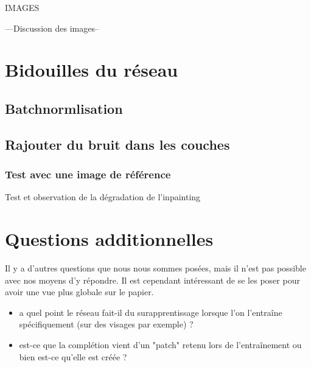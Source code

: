 \documentclass[12pt]{article}
\begin{document}
IMAGES

---Discussion des images--

\section{Bidouilles du réseau}



\subsection{Batchnormlisation}


\subsection{Rajouter du bruit dans les couches}

\subsubsection{Test avec une image de référence}
Test et observation de la dégradation de l'inpainting

\section{Questions additionnelles}

Il y a d'autres questions que nous nous sommes posées, mais il n'est pas possible avec nos moyens d'y répondre. Il est cependant intéressant de se les poser pour avoir une vue plus globale sur le papier.
\begin{itemize}
    \item a quel point le réseau fait-il du surapprentissage lorsque l'on l'entraîne spécifiquement (sur des visages par exemple) ?
    \item est-ce que la complétion vient d'un "patch" retenu lors de l'entraînement ou bien est-ce qu'elle est créée ?
\end{itemize}





\end{document}
